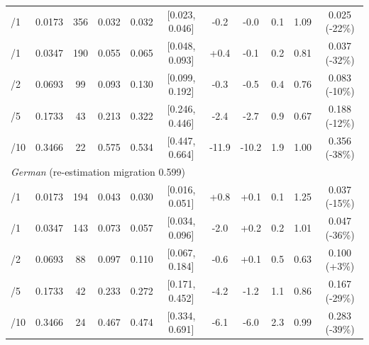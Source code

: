 \begin{table}[t]
{\begin{tabular}{lcccccccccc}
\quad 40/1 & 0.0173 & 356 & 0.032 & 0.032 & [0.023, 0.046] & -0.2 & -0.0 & 0.1 & 1.09 & 0.025 (-22\%) \\
\quad 20/1 & 0.0347 & 190 & 0.055 & 0.065 & [0.048, 0.093] & +0.4 & -0.1 & 0.2 & 0.81 & 0.037 (-32\%) \\
\quad 20/2 & 0.0693 & 99 & 0.093 & 0.130 & [0.099, 0.192] & -0.3 & -0.5 & 0.4 & 0.76 & 0.083 (-10\%) \\
\quad 20/5 & 0.1733 & 43 & 0.213 & 0.322 & [0.246, 0.446] & -2.4 & -2.7 & 0.9 & 0.67 & 0.188 (-12\%) \\
\quad 20/10 & 0.3466 & 22 & 0.575 & 0.534 & [0.447, 0.664] & -11.9 & -10.2 & 1.9 & 1.00 & 0.356 (-38\%) \\
\multicolumn{11}{l}{\textit{German} (re-estimation migration 0.599)}\\
\quad 40/1 & 0.0173 & 194 & 0.043 & 0.030 & [0.016, 0.051] & +0.8 & +0.1 & 0.1 & 1.25 & 0.037 (-15\%) \\
\quad 20/1 & 0.0347 & 143 & 0.073 & 0.057 & [0.034, 0.096] & -2.0 & +0.2 & 0.2 & 1.01 & 0.047 (-36\%) \\
\quad 20/2 & 0.0693 & 88 & 0.097 & 0.110 & [0.067, 0.184] & -0.6 & +0.1 & 0.5 & 0.63 & 0.100 (+3\%) \\
\quad 20/5 & 0.1733 & 42 & 0.233 & 0.272 & [0.171, 0.452] & -4.2 & -1.2 & 1.1 & 0.86 & 0.167 (-29\%) \\
\quad 20/10 & 0.3466 & 24 & 0.467 & 0.474 & [0.334, 0.691] & -6.1 & -6.0 & 2.3 & 0.99 & 0.283 (-39\%) \\
\bottomrule
\end{tabular}}
\end{table}
